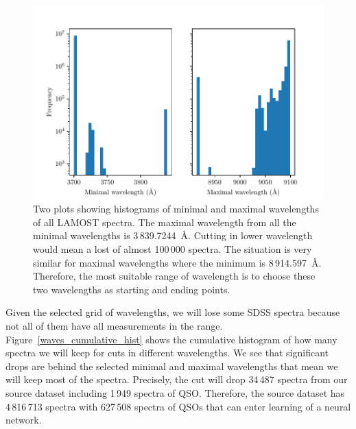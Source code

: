 \begin{figure}
\includegraphics[width=\textwidth]{img/wavemin_wavemax_hist.pdf}
\caption[Minimal and maximal wavelength of LAMOST DR5]{
	Two plots showing histograms of minimal and maximal wavelengths
	of all LAMOST spectra.
	The maximal wavelength from all the minimal wavelengths
	is 3\,839.7244~\AA{}.
	Cutting in lower wavelength
	would mean a lost of almost 100\,000 spectra.
	The situation is very similar for maximal wavelengths
	where the minimum is 8\,914.597~\AA{}.
	Therefore, the most suitable range of wavelength is to choose
	these two wavelengths as starting and ending points.
	}
\label{wavemin_wavemax_hist}
\end{figure}

Given the selected grid of wavelengths,
we will lose some SDSS spectra because not all of them have all measurements in the range.
Figure~\ref{waves_cumulative_hist} shows the cumulative histogram of how many spectra we will keep for cuts in different wavelengths.
We see that significant drops are behind the selected minimal and maximal wavelengths
that mean we will keep most of the spectra.
Precisely, the cut will drop 34\,487 spectra from our source dataset
including 1\,949 spectra of QSO.
Therefore, the source dataset has 4\,816\,713 spectra with 627\,508 spectra of QSOs that can enter learning of a neural network.

